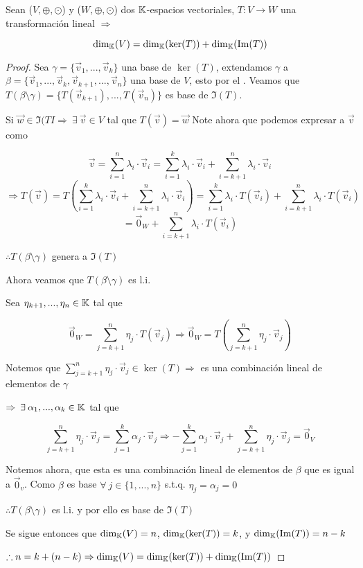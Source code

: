 \begin{theorem}  \label{theom216}
    Sean ($V, \oplus, \odot$) y ($W, \oplus, \odot$) dos $\mathbb{K}$-espacios vectoriales, $T : V \to W$ una transformación lineal $\Rightarrow$

     $${\dim}_{\mathbb{K}}(V) = {\dim}_{\mathbb{K}}(\ker(T)) + {\dim}_{\mathbb{K}}(\Im(T))$$
\end{theorem}

\begin{proof}
    Sea $\gamma = \{ \vec{v}_{1}, ..., \vec{v}_{k} \}$ una base de $\ker(T)$, extendamos $\gamma$ a $\beta = \{ \vec{v}_{1}, ..., \vec{v}_{k}, \vec{v}_{k+1}, ..., \vec{v}_{n} \} $ una base de $V$, esto por el . Veamos que $T(\beta \setminus \gamma) = \{T(\vec{v}_{k+1}), ..., T(\vec{v}_{n}) \}$ es base de $\Im(T)$.

    Si $\vec{w} \in \Im(TI \Rightarrow \: \exists \: \vec{v} \in V$ tal que $T(\vec{v}) = \vec{w}$ Note ahora que podemos expresar a $\vec{v}$ como

    $$\vec{v} = \sum_{i=1}^{n} \lambda_i \cdot \vec{v}_i = \sum_{i=1}^{k} \lambda_i \cdot \vec{v}_i + \sum_{i=k+1}^{n} \lambda_i \cdot \vec{v}_i$$
    $$\Rightarrow T (\vec{v}) = T \left( \sum_{i=1}^{k} \lambda_i \cdot \vec{v}_i + \sum_{i=k+1}^{n} \lambda_i \cdot \vec{v}_i \right) = \sum_{i=1}^{k} \lambda_i \cdot T(\vec{v}_i) + \sum_{i=k+1}^{n} \lambda_i \cdot T(\vec{v}_i)$$
    $$= \vec{0}_W + \sum_{i=k+1}^{n} \lambda_i \cdot T(\vec{v}_i)$$

    $\therefore T(\beta \setminus \gamma)$ genera a $\Im(T)$

    Ahora veamos que $T(\beta \setminus \gamma)$ es l.i.

    Sea ${\eta}_{k+1}, ..., {\eta}_{n} \in \mathbb{K}$ tal que 
    
    $$\vec{0}_W = \sum_{j=k+1}^{n} \eta_j \cdot T(\vec{v}_{j}) \Rightarrow \vec{0}_W = T \left( \sum_{j=k+1}^{n} \eta_j \cdot \vec{v}_{j} \right)$$

    Notemos que $ \sum_{j=k+1}^{n} \eta_j \cdot \vec{v}_{j} \in \ker(T) \Rightarrow$  es una combinación lineal de elementos de $\gamma$

    $\Rightarrow \: \exists \: \alpha_1, ..., \alpha_k \in \mathbb{K}$ tal que 

    $$ \sum_{j=k+1}^{n} \eta_j \cdot \vec{v}_{j} =  \sum_{j=1}^{k} \alpha_j \cdot \vec{v}_{j} \Rightarrow -  \sum_{j=1}^{k} \alpha_j \cdot \vec{v}_{j} + \sum_{j=k+1}^{n} \eta_j \cdot \vec{v}_{j} =  \vec{0}_V$$

    Notemos ahora, que esta es una combinación lineal de elementos de $\beta$ que es igual a $\vec{0}_v$. Como $\beta$ es base $\forall \: j \in \{1, ..., n \}$ s.t.q. $\eta_j = \alpha_j = 0 $

    $\therefore T(\beta \setminus \gamma)$ es l.i. y por ello es base de  $\Im(T)$

    Se sigue entonces que ${\dim}_{\mathbb{K}}(V) = n $, $ {\dim}_{\mathbb{K}}(\ker(T)) = k $, y ${\dim}_{\mathbb{K}}(\Im(T)) = n-k$

    $\therefore n = k + (n-k) \Rightarrow {\dim}_{\mathbb{K}}(V) = {\dim}_{\mathbb{K}}(\ker(T)) + {\dim}_{\mathbb{K}}(\Im(T))$
\end{proof}


